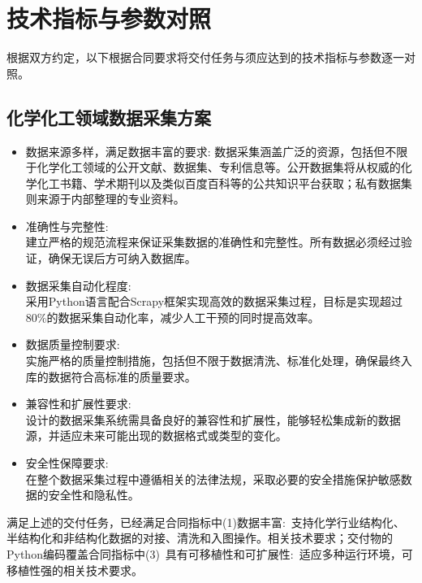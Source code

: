 \section{技术指标与参数对照}
根据双方约定，以下根据合同要求将交付任务与须应达到的技术指标与参数逐一对照。
\subsection{\hwfs 化学化工领域数据采集方案}
\begin{itemize}
	\item {数据来源多样，满足数据丰富的要求:}
		数据采集涵盖广泛的资源，包括但不限于化学化工领域的公开文献、数据集、专利信息等。公开数据集将从权威的化学化工书籍、学术期刊以及类似百度百科等的公共知识平台获取；私有数据集则来源于内部整理的专业资料。	\item {\hwfs 准确性与完整性:}\\
		建立严格的规范流程来保证采集数据的准确性和完整性。所有数据必须经过验证，确保无误后方可纳入数据库。 
	\item {数据采集自动化程度:}\\
		采用\textrm{Python}语言配合\textrm{Scrapy}框架实现高效的数据采集过程，目标是实现超过80\%的数据采集自动化率，减少人工干预的同时提高效率。

	\item %
		{数据质量控制要求:}\\
		实施严格的质量控制措施，包括但不限于数据清洗、标准化处理，确保最终入库的数据符合高标准的质量要求。

	\item {兼容性和扩展性要求:}\\
		设计的数据采集系统需具备良好的兼容性和扩展性，能够轻松集成新的数据源，并适应未来可能出现的数据格式或类型的变化。

	\item {安全性保障要求:}\\
		在整个数据采集过程中遵循相关的法律法规，采取必要的安全措施保护敏感数据的安全性和隐私性。
\end{itemize}
满足上述的交付任务，已经满足合同指标中{\heiti (1)数据丰富:~支持化学行业结构化、半结构化和非结构化数据的对接、清洗和入图操作。}相关技术要求；交付物的\textrm{Python}编码覆盖合同指标中{\heiti (3)~具有可移植性和可扩展性:~适应多种运行环境，可移植性强}的相关技术要求。


